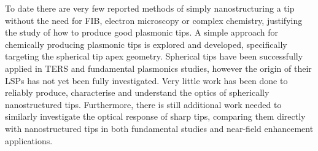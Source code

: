 \documentclass{article}
\begin{document}
To date there are very few reported methods of simply nanostructuring a tip without the need for FIB, electron microscopy or complex chemistry, justifying the study of how to produce good plasmonic tips. A simple approach for chemically producing plasmonic tips is explored and developed, specifically targeting the spherical tip apex geometry. Spherical tips have been successfully applied in TERS and fundamental plasmonics studies, however the origin of their LSPs has not yet been fully investigated. Very little work has been done to reliably produce, characterise and understand the optics of spherically nanostructured tips. Furthermore, there is still additional work needed to similarly investigate the optical response of sharp tips, comparing them directly with nanostructured tips in both fundamental studies and near-field enhancement applications.
\end{document}

